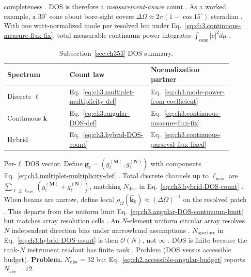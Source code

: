 completeness \cite{harrington2001}. DOS is therefore a \emph{measurement-aware} count \cite{stratton1941}.
As a worked example, a \(30^{\circ}\) cone about bore-sight covers \(\Delta\Omega\approx2\pi(1-\cos15^{\circ})\) steradian
\cite{jackson1999}. With one watt-normalized mode per resolved bin under
Eq.~\eqref{eq:ch3.continuous-measure-flux-fix}, total measurable continuum power integrates
\(\int_{\mathrm{cone}}|c|^{2}d\mu\) \cite{hansen1988}.
\begin{table}[t]
\centering
\caption{Subsection~\ref{sec:ch353} DOS summary.}
\label{tab:ch3.353-dos-summary}
\small
\begin{tabular}{@{}p{0.26\linewidth}p{0.34\linewidth}p{0.32\linewidth}@{}}
\toprule
Spectrum & Count law & Normalization partner \\
\midrule
Discrete \(\ell\) & Eq.~\eqref{eq:ch3.multiplet-multiplicity-def} & Eq.~\eqref{eq:ch3.mode-power-from-coefficient} \\
Continuous \(\hat{\mathbf{k}}\) & Eq.~\eqref{eq:ch3.angular-DOS-def} & Eq.~\eqref{eq:ch3.continuous-measure-flux-fix} \\
Hybrid & Eq.~\eqref{eq:ch3.hybrid-DOS-count} & Eq.~\eqref{eq:ch3.continuous-parseval-flux-fixed} \\
\bottomrule
\end{tabular}
\end{table}
Per-\(\ell\) DOS vector. Define \(\mathbf{g}_{\ell}=(g_{\ell}^{(\mathbf{M})},g_{\ell}^{(\mathbf{N})})\) with components
Eq.~\eqref{eq:ch3.multiplet-multiplicity-def} \cite{jackson1999}. Total discrete channels up to
\(\ell_{\max}\) are \(\sum_{\ell\le\ell_{\max}}(g_{\ell}^{(\mathbf{M})}+g_{\ell}^{(\mathbf{N})})\), matching
\(N_{\mathrm{disc}}\) in Eq.~\eqref{eq:ch3.hybrid-DOS-count} \cite{harrington2001}.
When beams are narrow, define local \(\rho_{\Omega}(\hat{\mathbf{k}}_{0})\approx(\Delta\Omega)^{-1}\) on the resolved
patch \cite{jackson1999}. This departs from the uniform limit
Eq.~\eqref{eq:ch3.angular-DOS-continuum-limit} but matches array resolution cells \cite{harrington2001}.
An \(N\)-element uniform circular array resolves \(N\) independent direction bins under narrowband assumptions
\cite{harrington2001}. \(N_{\mathrm{aperture}}\) in Eq.~\eqref{eq:ch3.hybrid-DOS-count} is then
\(\mathcal{O}(N)\), not \(\infty\) \cite{harrington2001}. DOS is finite because the rank-$N$ instrument readout has finite rank
\cite{stratton1941}.
Problem (DOS versus accessible budget). \textbf{Problem.} \(N_{\mathrm{disc}}=32\) but Eq.~\eqref{eq:ch2.accessible-angular-budget} reports \(N_{\mathrm{acc}}=12\).

